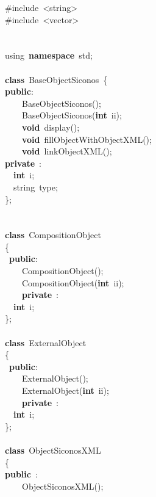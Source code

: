 {\ttfamily \raggedright \small
\#include\ <{}string>{}\\
\#include\ <{}vector>{}\\
\ \\
\ \\
using\ \textbf{namespace}\ std;\\
\ \\
\textbf{class}\ BaseObjectSiconos\ \{\\
\textbf{public}:\\
\ \ \ \ BaseObjectSiconos();\\
\ \ \ \ BaseObjectSiconos(\textbf{int}\ ii);\\
\ \ \ \ \textbf{void}\ display();\\
\ \ \ \ \textbf{void}\ fillObjectWithObjectXML();\\
\ \ \ \ \textbf{void}\ linkObjectXML();\\
\textbf{private}\ :\\
\ \ \textbf{int}\ i;\\
\ \ string\ type;\ \\
\};\\
\ \\
\ \\
\textbf{class}\ CompositionObject\\
\{\\
\ \textbf{public}:\\
\ \ \ \ CompositionObject();\\
\ \ \ \ CompositionObject(\textbf{int}\ ii);\\
\ \ \ \ \textbf{private}\ :\\
\ \ \textbf{int}\ i;\\
\};\\
\ \\
\textbf{class}\ ExternalObject\\
\{\\
\ \textbf{public}:\\
\ \ \ \ ExternalObject();\\
\ \ \ \ ExternalObject(\textbf{int}\ ii);\\
\ \ \ \ \textbf{private}\ :\\
\ \ \textbf{int}\ i;\\
\};\\
\ \\
\textbf{class}\ ObjectSiconosXML\ \\
\{\\
\textbf{public}\ :\\
\ \ \ \ ObjectSiconosXML();\\
}
